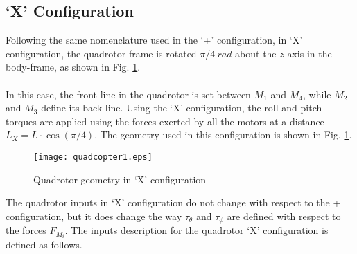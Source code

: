 \subsection{`X' Configuration}
Following the same nomenclature used in the `+' configuration, in `X' configuration, the quadrotor frame is rotated $\pi/4\ rad$ about the $z$-axis in the body-frame, as shown in Fig. \ref{fig:quadrotorX}. 
\\\\
In this case, the front-line in the quadrotor is set between $M_1$ and $M_4$, while $M_2$ and $M_3$ define its back line. Using the `X' configuration, the roll and pitch torques are applied using the forces exerted by all the motors at a distance $L_X = L\cdot \cos(\pi/4)$.  The geometry used in this configuration is shown in Fig. \ref{fig:quadrotorX}.
\begin{figure}[H]
\begin{center}
  \texttt{[image: quadcopter1.eps]}
\caption{Quadrotor geometry in `X' configuration} 
    \label{fig:quadrotorX}
    \end{center}
\end{figure}
The quadrotor inputs in `X' configuration do not change with respect to the + configuration, but it does change the way $\tau_\theta$ and $\tau_\phi$ are defined with respect to the forces $F_{M_i}$. The inputs description for the quadrotor `X' configuration is defined as follows.
